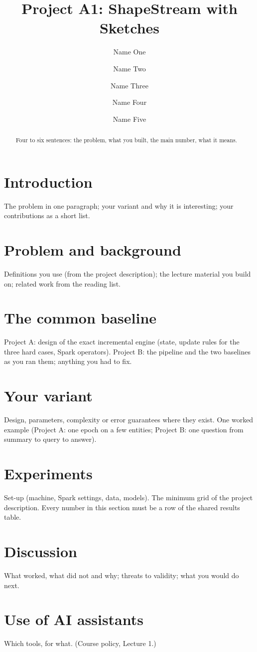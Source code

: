 \documentclass[runningheads]{llncs}
\begin{document}
\title{Project A1: ShapeStream with Sketches}   %
\author{Name One \and Name Two \and Name Three \and Name Four \and Name Five}
\maketitle

\begin{abstract}
Four to six sentences: the problem, what you built, the main number, what it means.
\end{abstract}

\section{Introduction}
The problem in one paragraph; your variant and why it is interesting; your contributions as a short list.

\section{Problem and background}
Definitions you use (from the project description); the lecture material you build on; related work from the reading list.

\section{The common baseline}
Project A: design of the exact incremental engine (state, update rules for the three hard cases, Spark operators).
Project B: the pipeline and the two baselines as you ran them; anything you had to fix.

\section{Your variant}
Design, parameters, complexity or error guarantees where they exist. One worked example
(Project A: one epoch on a few entities; Project B: one question from summary to query to answer).

\section{Experiments}
Set-up (machine, Spark settings, data, models). The minimum grid of the project description.
Every number in this section must be a row of the shared results table.

\section{Discussion}
What worked, what did not and why; threats to validity; what you would do next.

\section*{Use of AI assistants}
Which tools, for what. (Course policy, Lecture 1.)



\end{document}
